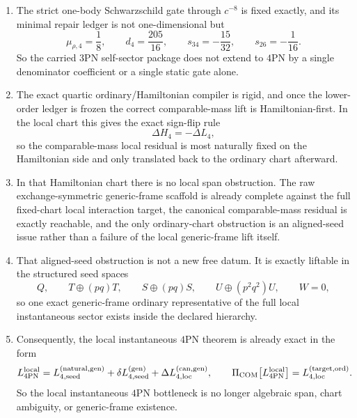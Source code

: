\documentclass[11pt]{article}
\begin{document}
\begin{enumerate}
  \item The strict one-body Schwarzschild gate through $c^{-8}$ is fixed
  exactly, and its minimal repair ledger is not one-dimensional but
  \begin{equation}
  \mu_{\rho,4}=\frac18,
  \qquad
  d_4=\frac{205}{16},
  \qquad
  s_{34}=-\frac{15}{32},
  \qquad
  s_{26}=-\frac1{16}.
  \label{eq:conclusions-onebody-ledger-4pn}
  \end{equation}
  So the carried $3$PN self-sector package does not extend to $4$PN by a single
  denominator coefficient or a single static gate alone.

  \item The exact quartic ordinary/Hamiltonian compiler is rigid, and once the
  lower-order ledger is frozen the correct comparable-mass lift is
  Hamiltonian-first.  In the local chart this gives the exact sign-flip rule
  \begin{equation}
  \Delta H_4=-\Delta L_4,
  \label{eq:conclusions-signflip-4pn}
  \end{equation}
  so the comparable-mass local residual is most naturally fixed on the
  Hamiltonian side and only translated back to the ordinary chart afterward.

  \item In that Hamiltonian chart there is no local span obstruction.  The raw
  exchange-symmetric generic-frame scaffold is already complete against the full
  fixed-chart local interaction target, the canonical comparable-mass residual
  is exactly reachable, and the only ordinary-chart obstruction is an
  aligned-seed issue rather than a failure of the local generic-frame lift
  itself.

  \item That aligned-seed obstruction is not a new free datum.  It is exactly
  liftable in the structured seed spaces
  \begin{equation}
  Q,
  \qquad
  T\oplus(pq)T,
  \qquad
  S\oplus(pq)S,
  \qquad
  U\oplus(p^2q^2)U,
  \qquad
  W=0,
  \label{eq:conclusions-structured-seed-spaces-4pn}
  \end{equation}
  so one exact generic-frame ordinary representative of the full local
  instantaneous sector exists inside the declared hierarchy.

  \item Consequently, the local instantaneous $4$PN theorem is already exact in
  the form
  \begin{equation}
  L_{4\mathrm{PN}}^{\mathrm{local}}
  =
  L_{4,\mathrm{seed}}^{(\mathrm{natural,gen})}
  +
  \delta L_{4,\mathrm{seed}}^{(\mathrm{gen})}
  +
  \Delta L_{4,\mathrm{loc}}^{(\mathrm{can,gen})},
  \qquad
  \Pi_{\rm COM}\!\left[L_{4\mathrm{PN}}^{\mathrm{local}}\right]
  =
  L_{4,\mathrm{loc}}^{(\mathrm{target,ord})}.
  \label{eq:conclusions-local-theorem-4pn}
  \end{equation}
  So the local instantaneous $4$PN bottleneck is no longer algebraic span,
  chart ambiguity, or generic-frame existence.


\end{enumerate}
\end{document}
